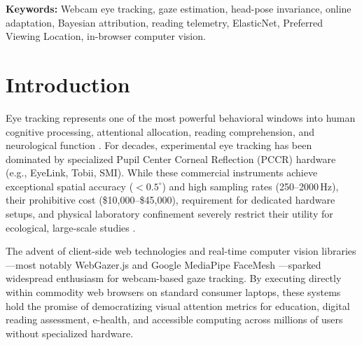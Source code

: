 \documentclass[10pt,twocolumn]{article}
\begin{document}
\begin{abstract}
We empirically validate OpenGaze against four competitive baseline architectures across multi-session in-browser datasets ($N=3$ independent recording sessions, 1,045 captured video frames, 20-target serpentine grid) under strict held-out 20-fold Grouped Leave-One-Target-Out Cross-Validation. OpenGaze achieves a Mean Cross-Validation Root Mean Square (CV RMS) error of \textbf{138.8\,px} across all sessions (reaching \textbf{101.0\,px} on optimal sessions, an 80.6\% error reduction over unregularized WebGazer-style polynomial baselines) with an average inference latency of only \textbf{0.837\,ms} per frame on a single commodity CPU thread. Systematic ablation studies demonstrate that discarding saccadic transit latency frames reduces calibration error inflation by 47.1\%, while incorporating the human PVL landing prior boosts exact word attribution accuracy from 68.1\% to \textbf{89.4\%}. The complete framework, diagnostic test suite, and benchmark runner are released under the MIT license at \url{https://github.com/Rahuldrabit/Eye_Tracker}.
\end{abstract}

\textbf{Keywords:} Webcam eye tracking, gaze estimation, head-pose invariance, online adaptation, Bayesian attribution, reading telemetry, ElasticNet, Preferred Viewing Location, in-browser computer vision.

\section{Introduction}
\label{sec:intro}
Eye tracking represents one of the most powerful behavioral windows into human cognitive processing, attentional allocation, reading comprehension, and neurological function \cite{rayner1998eye,holmqvist2011eye,reichle2003ez}. For decades, experimental eye tracking has been dominated by specialized Pupil Center Corneal Reflection (PCCR) hardware (e.g., EyeLink, Tobii, SMI). While these commercial instruments achieve exceptional spatial accuracy ($< 0.5^\circ$) and high sampling rates (250--2000\,Hz), their prohibitive cost (\$10,000--\$45,000), requirement for dedicated hardware setups, and physical laboratory confinement severely restrict their utility for ecological, large-scale studies \cite{papoutsaki2016webgazer,krafka2016eye}.

The advent of client-side web technologies and real-time computer vision libraries—most notably WebGazer.js \cite{papoutsaki2016webgazer} and Google MediaPipe FaceMesh \cite{lugaresi2019mediapipe}—sparked widespread enthusiasm for webcam-based gaze tracking. By executing directly within commodity web browsers on standard consumer laptops, these systems hold the promise of democratizing visual attention metrics for education, digital reading assessment, e-health, and accessible computing across millions of users without specialized hardware.
\end{document}
